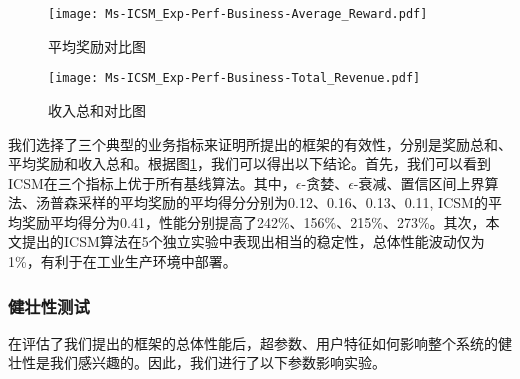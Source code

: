 \begin{figure}[hbt]
	\centering
	\texttt{[image: Ms-ICSM\_Exp-Perf-Business-Average\_Reward.pdf]}
	\caption{平均奖励对比图}
	\label{Fig:Exp-Perf-Business-Average_Reward}
\end{figure}

\begin{figure}[hbt]
	\centering
	\texttt{[image: Ms-ICSM\_Exp-Perf-Business-Total\_Revenue.pdf]}
	\caption{收入总和对比图}
	\label{Fig:Exp-Perf-Business-Total_Revenue}
\end{figure}




我们选择了三个典型的业务指标来证明所提出的框架的有效性，分别是奖励总和、平均奖励和收入总和。根据图\ref{Fig:Exp-Perf-Business-Average_Reward}，我们可以得出以下结论。首先，我们可以看到ICSM在三个指标上优于所有基线算法。其中，$\epsilon$-贪婪、$\epsilon$-衰减、置信区间上界算法、汤普森采样的平均奖励的平均得分分别为0.12、0.16、0.13、0.11, ICSM的平均奖励平均得分为0.41，性能分别提高了242\%、156\%、215\%、273\%。其次，本文提出的ICSM算法在5个独立实验中表现出相当的稳定性，总体性能波动仅为1\%，有利于在工业生产环境中部署。







\subsubsection{健壮性测试}
在评估了我们提出的框架的总体性能后，超参数、用户特征如何影响整个系统的健壮性是我们感兴趣的。因此，我们进行了以下参数影响实验。


